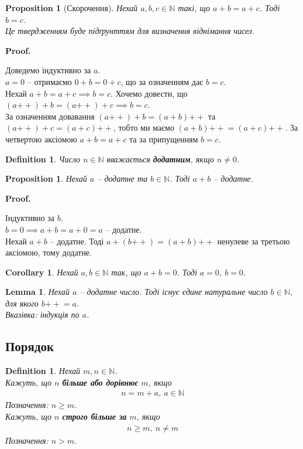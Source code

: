 \documentclass[a4paper, 14pt]{extarticle}
\makeatletter
\theoremstyle{theoremdd}
\theoremstyle{theoremdd}
\newtheorem{definition}[theorem]{Definition}
\theoremstyle{theoremdd}
\theoremstyle{theoremdd}
\theoremstyle{theoremdd}
\theoremstyle{theoremdd}
\theoremstyle{theoremdd}
\theoremstyle{theoremdd}
\theoremstyle{theoremdd}
\theoremstyle{theoremdd}
\newtheorem{proposition}[theorem]{Proposition}
\theoremstyle{theoremdd}
\theoremstyle{theoremdd}
\theoremstyle{theoremdd}
\theoremstyle{theoremdd}
\newtheorem{lemma}[theorem]{Lemma}
\theoremstyle{theoremdd}
\newtheorem{corollary}[theorem]{Corollary}
\theoremstyle{theoremdd}
\renewenvironment{proof}[1][Proof.\\]{\par
\pushQED{\hfill \qed}%
\normalfont \topsep6\p@\@plus6\p@\relax
\trivlist
\item\relax
{\bfseries
#1\@addpunct{.}}\hspace\labelsep\ignorespaces
}{%
\popQED\endtrivlist\@endpefalse
}
\newcommand{\plusplus}{\!\!\mathrel{++}}
\makeatother
\begin{document}
\begin{proposition}[Скорочення]
Нехай $a,b,c \in \mathbb{N}$ такі, що $a+b = a+c$. Тоді $b = c$.\\
\textit{Це твердженням буде підґрунттям для визначення віднімання чисел.}
\end{proposition}

\begin{proof}
Доведемо індуктивно за $a$.\\
$a = 0$ -- отримаємо $0 + b = 0 + c$, що за означенням дає $b = c$.\\
Нехай $a + b = a + c \implies b = c$. Хочемо довести, що \\ $(a\plusplus) + b = (a\plusplus) + c \implies b = c$.\\
За означенням довавання $(a\plusplus) + b = (a+b)\plusplus$ та $(a\plusplus) + c = (a +c)\plusplus$, тобто ми маємо $(a+b)\plusplus = (a+c)\plusplus$. За четвертою аксіомою $a + b = a + c$ та за припущенням $b = c$.
\end{proof}

\begin{definition}
Число $n \in \mathbb{N}$ вважається \textbf{додатним}, якщо $n\neq 0$.
\end{definition}

\begin{proposition}
Нехай $a$ -- додатне та $b \in \mathbb{N}$. Тоді $a + b$ -- додатне.
\end{proposition}

\begin{proof}
Індуктивно за $b$.\\
$b = 0 \implies a+b = a+0 = a$ -- додатне.\\
Нехай $a + b$ -- додатне. Тоді $a + (b \plusplus) = (a+b)\plusplus$ ненулеве за третьою аксіомою, тому додатне.
\end{proof}

\begin{corollary}
Нехай $a,b \in \mathbb{N}$ так, що $a+b = 0$. Тоді $a = 0,\ b = 0$.
\end{corollary}

\begin{lemma}
Нехай $a$ -- додатне число. Тоді існує єдине натуральне число $b \in \mathbb{N}$, для якого $b \plusplus = a$. \\
\textit{Вказівка: індукція по $a$.}
\end{lemma}

\subsection{Порядок}
\begin{definition}
Нехай $m,n \in \mathbb{N}$.\\
Кажуть, що $n$ \textbf{більше або дорівнює} $m$, якщо \begin{align*}
n = m + a,\ a \in \mathbb{N}
\end{align*}
Позначення: $n \geq m$.\\
Кажуть, що $n$ \textbf{строго більше за} $m$, якщо
\begin{align*}
n \geq m,\ n \neq m
\end{align*}
Позначення: $n > m$.
\end{definition}
\end{document}
